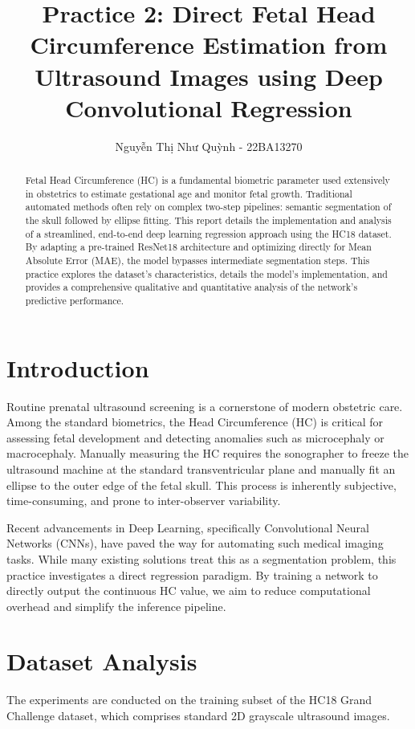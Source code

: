 \documentclass[10pt,twocolumn,letterpaper]{article}
\title{\textbf{Practice 2: Direct Fetal Head Circumference Estimation from Ultrasound Images using Deep Convolutional Regression}}
\author{Nguyễn Thị Như Quỳnh - 22BA13270}
\date{\vspace{-5ex}} %
\begin{document}
\maketitle

\begin{abstract}
Fetal Head Circumference (HC) is a fundamental biometric parameter used extensively in obstetrics to estimate gestational age and monitor fetal growth. Traditional automated methods often rely on complex two-step pipelines: semantic segmentation of the skull followed by ellipse fitting. This report details the implementation and analysis of a streamlined, end-to-end deep learning regression approach using the HC18 dataset. By adapting a pre-trained ResNet18 architecture and optimizing directly for Mean Absolute Error (MAE), the model bypasses intermediate segmentation steps. This practice explores the dataset's characteristics, details the model's implementation, and provides a comprehensive qualitative and quantitative analysis of the network's predictive performance.
\end{abstract}

\section{Introduction}
Routine prenatal ultrasound screening is a cornerstone of modern obstetric care. Among the standard biometrics, the Head Circumference (HC) is critical for assessing fetal development and detecting anomalies such as microcephaly or macrocephaly. Manually measuring the HC requires the sonographer to freeze the ultrasound machine at the standard transventricular plane and manually fit an ellipse to the outer edge of the fetal skull. This process is inherently subjective, time-consuming, and prone to inter-observer variability.

Recent advancements in Deep Learning, specifically Convolutional Neural Networks (CNNs), have paved the way for automating such medical imaging tasks. While many existing solutions treat this as a segmentation problem, this practice investigates a direct regression paradigm. By training a network to directly output the continuous HC value, we aim to reduce computational overhead and simplify the inference pipeline. 

\section{Dataset Analysis}
The experiments are conducted on the training subset of the HC18 Grand Challenge dataset, which comprises standard 2D grayscale ultrasound images.
\end{document}
